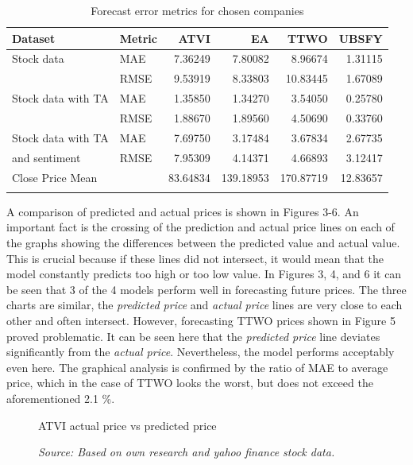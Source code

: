 \documentclass[11pt]{article} %
\begin{document}
\begin{table}[H]
\centering
\caption{Forecast error metrics for chosen companies}
\begin{tabular}{llrrrr}
\toprule
 Dataset & Metric &          ATVI &           EA &         TTWO &        UBSFY \\
\midrule
Stock data& MAE              &   7.36249 &    7.80082 &    8.96674 &  1.31115 \\
&RMSE             &   9.53919 &    8.33803 &    10.83445 &   1.67089 \\
Stock data with TA& MAE              &   1.35850 &    1.34270 &    3.54050 &   0.25780 \\
&RMSE             &   1.88670 &    1.89560 &    4.50690 &   0.33760 \\
Stock data with TA& MAE              &   7.69750 &    3.17484 &    3.67834 &   2.67735 \\
and sentiment& RMSE              &   7.95309 &    4.14371 &    4.66893 &   3.12417 \\
\midrule
Close Price Mean & &  83.64834 &  139.18953 &  170.87719 &  12.83657 \\


&               &    &     &    &    \\
\bottomrule
\end{tabular}
\end{table}

A comparison of predicted and actual prices is shown in Figures 3-6. An important fact is the crossing of the prediction and actual price lines on each of the graphs showing the differences between the predicted value and actual value. This is crucial because if these lines did not intersect, it would mean that the model constantly predicts too high or too low value. In Figures 3, 4, and 6 it can be seen that 3 of the 4 models perform well in forecasting future prices. The three charts are similar, the \textit{predicted price} and \textit{actual price} lines are very close to each other and often intersect. However, forecasting TTWO prices shown in Figure 5 proved problematic. It can be seen here that the \textit{predicted price} line deviates significantly from the \textit{actual price}. Nevertheless, the model performs acceptably even here. The graphical analysis is confirmed by the ratio of MAE to average price, which in the case of TTWO looks the worst, but does not exceed the aforementioned 2.1 \%.
\\

\begin{figure}[H]
\caption{ATVI actual price vs predicted price}
\begin{adjustbox}{width=1.3\textwidth,center}

\end{adjustbox}
\caption*{\textit{Source: Based on own research and yahoo finance stock data.}}
\end{figure}
\end{document}
